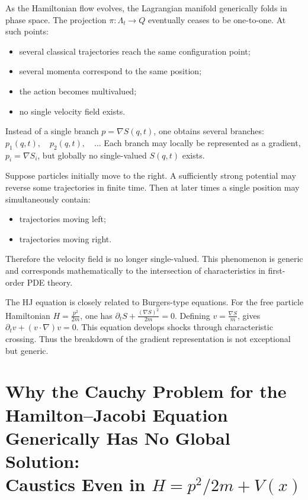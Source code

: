As the Hamiltonian flow evolves, the Lagrangian manifold generically folds in
phase space. The projection $\pi:\Lambda_t\to Q$ eventually ceases to be
one-to-one. At such points:
\begin{itemize}
\item several classical trajectories reach the same configuration point;
\item several momenta correspond to the same position;
\item the action becomes multivalued;
\item no single velocity field exists.
\end{itemize}
Instead of a single branch $p=\nabla S(q,t)$,
one obtains several branches: $p_1(q,t),\quad p_2(q,t),\quad \dots$
Each branch may locally be represented as a gradient,
$p_i=\nabla S_i$, but globally no single-valued $S(q,t)$ exists.

Suppose particles initially move to the right. A sufficiently strong potential
may reverse some trajectories in finite time. Then at later times a single
position may simultaneously contain:
\begin{itemize}
\item trajectories moving left;
\item trajectories moving right.
\end{itemize}
Therefore the velocity field is no longer single-valued.
This phenomenon is generic and corresponds mathematically to the intersection
of characteristics in first-order PDE theory.

The HJ equation is closely related to Burgers-type equations.
For the free particle Hamiltonian $H=\frac{p^2}{2m}$,
one has $\partial_t S + \frac{(\nabla S)^2}{2m}=0$.
Defining $v=\frac{\nabla S}{m}$, gives $\partial_t v + (v\cdot\nabla)v=0$.
This equation develops shocks through characteristic crossing. Thus the
breakdown of the gradient representation is not exceptional but generic.


\section{Why the Cauchy Problem for the Hamilton--Jacobi Equation\\
Generically Has No Global Solution:\\
Caustics Even in $H=p^2/2m+V(x)$}

